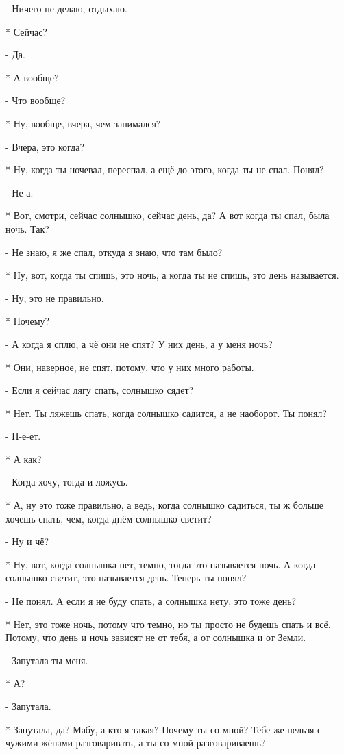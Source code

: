 - Ничего не делаю, отдыхаю.

* Сейчас?

- Да.

* А вообще?

- Что вообще?

* Ну, вообще, вчера, чем занимался?

- Вчера, это когда?

* Ну,  когда ты ночевал, переспал, а ещё до этого, когда ты не спал. Понял?

- Не-а.

* Вот, смотри, сейчас солнышко, сейчас день, да?  А вот когда ты спал, была ночь. Так?

- Не знаю, я же спал, откуда я знаю, что там было?

* Ну, вот, когда ты спишь, это ночь, а когда ты не спишь, это день называется.

- Ну, это не правильно.

* Почему?

- А когда я сплю, а чё они не спят? У них день, а у меня ночь?

* Они, наверное, не спят, потому, что у них много работы.

- Если я сейчас лягу спать, солнышко сядет?

* Нет. Ты ляжешь спать, когда солнышко садится, а не наоборот. Ты понял?

- Н-е-ет.

* А как?

- Когда хочу, тогда и ложусь.

* А, ну это тоже правильно, а ведь, когда солнышко садиться, ты ж больше хочешь спать, чем, когда днём солнышко светит? 

- Ну и чё?

* Ну, вот, когда солнышка нет, темно, тогда это называется ночь. А когда солнышко светит, это называется день. Теперь ты понял?

- Не понял. А если я не буду спать, а солнышка нету, это тоже день?

* Нет, это тоже ночь, потому что темно, но ты просто не будешь спать и всё. Потому, что день и ночь зависят не от тебя, а от солнышка и от Земли.

- Запутала ты меня.

* А?

- Запутала.

* Запутала, да? Мабу, а кто я такая? Почему ты со мной? Тебе же нельзя с чужими жёнами разговаривать, а ты со мной разговариваешь?

